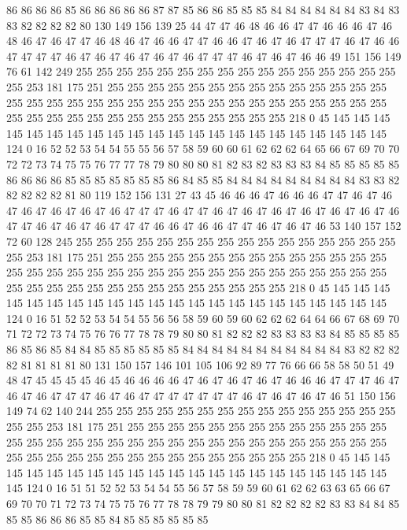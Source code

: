 86 86 86 86 85 86 86 86 86 86 87 87 85 86 86 85 85 85 84 84
84 84 84 84 83 84 83 83 82 82 82 82 80 130 149 156 139 25 44 47
47 46 48 46 46 47 47 46 46 46 47 46 48 46 47 46 47 47 46 48
46 47 46 46 47 47 46 46 47 46 47 46 47 47 47 46 47 46 46 47
47 47 47 46 47 46 47 46 47 46 47 46 47 47 47 46 47 46 47 46
46 49 151 156 149 76 61 142 249 255 255 255 255 255 255 255 255 255 255 255
255 255 255 255 255 255 253 181 175 251 255 255 255 255 255 255 255 255 255 255
255 255 255 255 255 255 255 255 255 255 255 255 255 255 255 255 255 255 255 255
255 255 255 255 255 255 255 255 255 255 255 255 255 255 255 255 255 218 0 45
145 145 145 145 145 145 145 145 145 145 145 145 145 145 145 145 145 145 145 145
145 145 124 0 16 52 52 53 54 54 55 55 56 57 58 59 60 60 61 62
62 62 64 65 66 67 69 70 70 72 72 73 74 75 75 76 77 77 78 79
80 80 80 81 82 83 82 83 83 83 84 85 85 85 85 85 86 86 86 86
85 85 85 85 85 85 85 86 84 85 85 84 84 84 84 84 84 84 84 84
83 83 82 82 82 82 82 81 80 119 152 156 131 27 43 45 46 46 46 47
46 46 46 47 47 46 47 46 47 46 47 46 47 46 47 46 47 47 47 46
47 47 46 47 46 47 46 47 46 47 46 47 46 47 46 47 47 46 47 46
47 46 47 47 47 46 46 47 46 46 47 47 46 47 46 47 46 53 140 157
152 72 60 128 245 255 255 255 255 255 255 255 255 255 255 255 255 255 255 255
255 255 253 181 175 251 255 255 255 255 255 255 255 255 255 255 255 255 255 255
255 255 255 255 255 255 255 255 255 255 255 255 255 255 255 255 255 255 255 255
255 255 255 255 255 255 255 255 255 255 255 255 255 218 0 45 145 145 145 145
145 145 145 145 145 145 145 145 145 145 145 145 145 145 145 145 145 145 124 0
16 51 52 52 53 54 54 55 56 56 58 59 60 59 60 62 62 62 64 64
66 67 68 69 70 71 72 72 73 74 75 76 76 77 78 78 79 80 80 81
82 82 82 83 83 83 83 84 85 85 85 85 86 85 86 85 84 84 85 85
85 85 85 85 84 84 84 84 84 84 84 84 84 84 84 83 82 82 82 82
81 81 81 81 80 131 150 157 146 101 105 106 92 89 77 76 66 66 58 58
50 51 49 48 47 45 45 45 45 46 45 46 46 46 46 47 46 47 46 47
46 47 46 46 46 47 47 47 46 47 46 47 46 47 47 47 46 47 46 47
47 47 47 47 47 47 46 47 46 47 46 47 46 51 150 156 149 74 62 140
244 255 255 255 255 255 255 255 255 255 255 255 255 255 255 255 255 255 253 181
175 251 255 255 255 255 255 255 255 255 255 255 255 255 255 255 255 255 255 255
255 255 255 255 255 255 255 255 255 255 255 255 255 255 255 255 255 255 255 255
255 255 255 255 255 255 255 255 255 218 0 45 145 145 145 145 145 145 145 145
145 145 145 145 145 145 145 145 145 145 145 145 145 145 124 0 16 51 51 52
52 53 54 54 55 56 57 58 59 59 60 61 62 62 63 63 65 66 67 69
70 70 71 72 73 74 75 75 76 77 78 78 79 79 80 80 81 82 82 82
82 83 83 84 84 85 85 85 86 86 86 85 85 84 85 85 85 85 85 85
